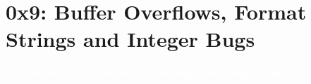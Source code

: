 \documentclass[aspectratio=169]{beamer}
\begin{document}
\section{0x9: Buffer Overflows, Format Strings and Integer Bugs}
{
\begin{frame}
\huge{\textcolor{white}{\textbf{0x9: Buffer Overflows, Format Strings and Integer Bugs}}}
\end{frame}
}
\end{document}
